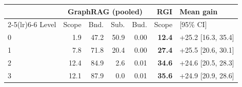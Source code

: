 \setlength{\tabcolsep}{4pt}
\begin{tabular}{@{}lrrrrrl@{}}
\toprule
 & \multicolumn{4}{c}{GraphRAG (pooled)} & RGI & Mean gain \\
\cmidrule(lr){2-5}\cmidrule(lr){6-6}
Level & Scope & Bnd. & Sub. & Bud. & Scope & [95\% CI] \\
\midrule
0 & 1.9 & 47.2 & 50.9 & 0.00 & \textbf{12.4} & +25.2 [16.3, 35.4] \\
1 & 7.8 & 71.8 & 20.4 & 0.00 & \textbf{27.4} & +25.5 [20.6, 30.1] \\
2 & 12.4 & 84.9 & 2.6 & 0.01 & \textbf{34.6} & +24.6 [20.5, 28.3] \\
3 & 12.1 & 87.9 & 0.0 & 0.01 & \textbf{35.6} & +24.9 [20.9, 28.6] \\
\bottomrule
\end{tabular}
